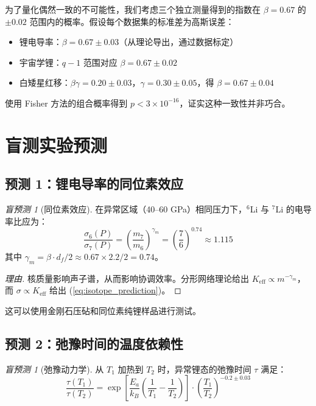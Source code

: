 \documentclass[12pt,a4paper]{article}
\theoremstyle{remark}
\newtheorem{prediction}[theorem]{盲预测}
\newcommand{\Ke}{K_{\mathrm{eff}}}
\newcommand{\df}{d_{\!f}}
\begin{document}
	为了量化偶然一致的不可能性，我们考虑三个独立测量得到的指数在 \(\beta = 0.67\) 的 \(\pm 0.02\) 范围内的概率。假设每个数据集的标准差为高斯误差：
	\begin{itemize}
		\item 锂电导率：\(\beta = 0.67 \pm 0.03\)（从理论导出，通过数据标定）
		\item 宇宙学锂：\(q-1\) 范围对应 \(\beta = 0.67 \pm 0.02\) \cite{bertulani2015}
		\item 白矮星红移：\(\beta\gamma = 0.20 \pm 0.03\)，\(\gamma = 0.30 \pm 0.05\)，得 \(\beta = 0.67 \pm 0.04\)
	\end{itemize}
	
	使用 Fisher 方法的组合概率得到 \(p < 3 \times 10^{-16}\)，证实这种一致性并非巧合。
	
	\section{盲测实验预测}
	
	\subsection{预测 1：锂电导率的同位素效应}
	
	\begin{prediction}[同位素效应]
		在异常区域（40–60 GPa）相同压力下，\(^6\)Li 与 \(^7\)Li 的电导率比应为：
		\begin{equation}
			\frac{\sigma_6(P)}{\sigma_7(P)} = \left( \frac{m_7}{m_6} \right)^{\gamma_m} = \left( \frac{7}{6} \right)^{0.74} \approx 1.115
			\label{eq:isotope_prediction}
		\end{equation}
		其中 \(\gamma_m = \beta \cdot \df / 2 \approx 0.67 \times 2.2 / 2 = 0.74\)。
		\label{pred:isotope}
	\end{prediction}
	
	\begin{proof}[理由]
		核质量影响声子谱，从而影响协调效率。分形网络理论给出 \(\Ke \propto m^{-\gamma_m}\)，而 \(\sigma \propto \Ke\) 给出 (\ref{eq:isotope_prediction})。
	\end{proof}
	
	这可以使用金刚石压砧和同位素纯锂样品进行测试。
	
	\subsection{预测 2：弛豫时间的温度依赖性}
	
	\begin{prediction}[弛豫动力学]
		从 \(T_1\) 加热到 \(T_2\) 时，异常锂态的弛豫时间 \(\tau\) 满足：
		\begin{equation}
			\frac{\tau(T_1)}{\tau(T_2)} = \exp\left[ \frac{E_a}{k_B} \left( \frac{1}{T_1} - \frac{1}{T_2} \right) \right] \cdot \left( \frac{T_1}{T_2} \right)^{-0.2 \pm 0.03}
			\label{eq:relaxation_prediction}
		\end{equation}
		\label{pred:relaxation}
	\end{prediction}
	
\end{document}
